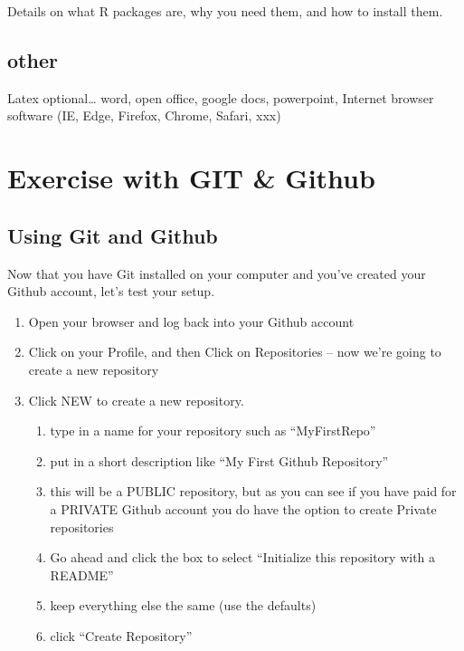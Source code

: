 \documentclass[]{book}
\providecommand{\tightlist}{%
  \setlength{\itemsep}{0pt}\setlength{\parskip}{0pt}}
\theoremstyle{definition}
\theoremstyle{definition}
\theoremstyle{definition}
\theoremstyle{remark}
\begin{document}
Details on what R packages are, why you need them, and how to install
them.

\section{other}\label{other}

Latex optional\ldots{} word, open office, google docs, powerpoint,
Internet browser software (IE, Edge, Firefox, Chrome, Safari, xxx)

\chapter{Exercise with GIT \& Github}\label{gitexercise}

\section{Using Git and Github}\label{using-git-and-github}

Now that you have Git installed on your computer and you've created your
Github account, let's test your setup.

\begin{enumerate}
\def\labelenumi{\arabic{enumi}.}
\tightlist
\item
  Open your browser and log back into your Github account
\item
  Click on your Profile, and then Click on Repositories -- now we're
  going to create a new repository
\item
  Click NEW to create a new repository.

  \begin{enumerate}
  \def\labelenumii{\alph{enumii}.}
  \tightlist
  \item
    type in a name for your repository such as ``MyFirstRepo''
  \item
    put in a short description like ``My First Github Repository''
  \item
    this will be a PUBLIC repository, but as you can see if you have
    paid for a PRIVATE Github account you do have the option to create
    Private repositories
  \item
    Go ahead and click the box to select ``Initialize this repository
    with a README''
  \item
    keep everything else the same (use the defaults)
  \item
    click ``Create Repository''
  \end{enumerate}
\end{enumerate}
\end{document}
